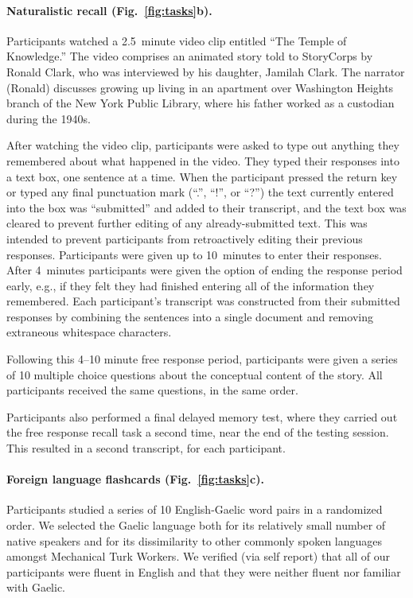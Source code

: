 \documentclass[10pt]{article}
\begin{document}
\paragraph*{Naturalistic recall (Fig.~\ref{fig:tasks}b).}
Participants watched a 2.5~minute video clip entitled ``The Temple of
Knowledge.''  The video comprises an animated story told to StoryCorps
by Ronald Clark, who was interviewed by his daughter, Jamilah Clark.
The narrator (Ronald) discusses growing up living in an apartment over Washington
Heights branch of the New York Public Library, where his father worked
as a custodian during the 1940s.

After watching the video clip, participants were asked to type out
anything they remembered about what happened in the video.  They typed
their responses into a text box, one sentence at a time.  When the
participant pressed the return key or typed any final punctuation mark
(``.'', ``!'', or ``?'') the text currently entered into the box was
``submitted'' and added to their transcript, and the text box was
cleared to prevent further editing of any already-submitted text.
This was intended to prevent participants from retroactively editing
their previous responses.  Participants were given up to 10~minutes to
enter their responses.  After 4~minutes participants were given the
option of ending the response period early, e.g., if they felt they had finished
entering all of the information they remembered.  Each participant's
transcript was constructed from their submitted responses by combining
the sentences into a single document and removing extraneous
whitespace characters.

Following this 4--10 minute free response period, participants were
given a series of 10 multiple choice questions about the conceptual
content of the story.  All participants received the same questions,
in the same order.

Participants also performed a final delayed memory test, where they
carried out the free response recall task a second time, near the end
of the testing session.  This resulted in a second transcript, for
each participant.

\paragraph*{Foreign language flashcards (Fig.~\ref{fig:tasks}c).}
Participants studied a series of 10 English-Gaelic word pairs in a
randomized order.  We selected the Gaelic language both for its
relatively small number of native speakers and for its dissimilarity
to other commonly spoken languages amongst Mechanical Turk Workers.
We verified (via self report) that all of our participants were fluent in English and
that they were neither fluent nor familiar with Gaelic.
\end{document}
